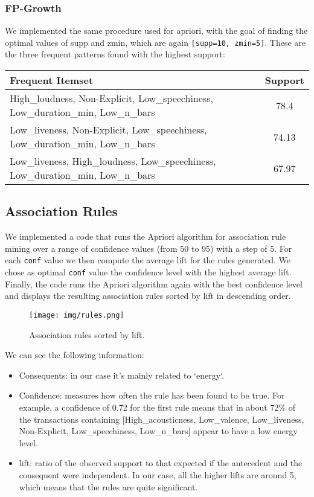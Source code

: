 \subsubsection*{FP-Growth}
We implemented the same procedure used for apriori, with the goal of finding the optimal values of supp and zmin, which are again \texttt{[supp=10, zmin=5]}. These are the three frequent patterns found with the highest support:\\
\begin{center}
\tiny{
\begin{tabular}[ht]
{|l|c|}
\hline
\textbf{Frequent Itemset} & \textbf{Support} \\
\hline
High\_loudness, Non-Explicit, Low\_speechiness, Low\_duration\_min, Low\_n\_bars & 78.4 \\
Low\_liveness, Non-Explicit, Low\_speechiness, Low\_duration\_min, Low\_n\_bars & 74.13 \\
Low\_liveness, High\_loudness, Low\_speechiness, Low\_duration\_min, Low\_n\_bars & 67.97 \\
\hline
\end{tabular}
}
\end{center}
\subsection{Association Rules}
We implemented a code that runs the Apriori algorithm for association rule mining over a range of confidence values (from 50 to 95) with a step of 5. For each \texttt{conf} value we then compute the average lift for the rules generated. We chose as optimal \texttt{conf} value the confidence level with the highest average lift. Finally, the code runs the Apriori algorithm again with the best confidence level and displays the resulting association rules sorted by lift in descending order.
\begin{figure}[H]
    \centering
    \texttt{[image: img/rules.png]}
    \caption{Association rules sorted by lift.}
    \label{fig:enter-label}
\end{figure}
We can see the following information:
\begin{itemize}
    \item Consequents: in our case it's mainly related to `energy`.
    \item Confidence: measures how often the rule has been found to be true. For example, a confidence of 0.72 for the first rule means that in about 72\% of the transactions containing [High\_acousticness, Low\_valence, Low\_liveness, Non-Explicit, Low\_speechiness, Low\_n\_bars] appear to have a low energy level.
    \item lift: ratio of the observed support to that expected if the antecedent and the consequent were independent. In our case, all the higher lifts are around 5, which means that the rules are quite significant.
\end{itemize}

